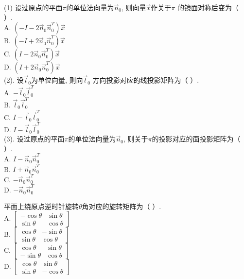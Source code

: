 \begin{ex}\label{8.8}
(1) 设过原点的平面$\pi$的单位法向量为$\vec{n}_0$, 则向量$\vec{x}$作关于$\pi$ 的镜面对称后变为（     ）.\\
A. $(-I-2\vec{n}_0\vec{n}_0^T )\vec{x}$\\
B. $(-I+2\vec{n}_0\vec{n}_0^T )\vec{x}$\\
C. $(I-2\vec{n}_0\vec{n}_0^T )\vec{x}$\\
D. $(I+2\vec{n}_0\vec{n}_0^T )\vec{x}$\\
(2). 设$\vec{l}_0$为单位向量, 则向$\vec{l}_0$ 方向投影对应的线投影矩阵为（     ）.\\
A. $-\vec{l}_0 \vec{l}_0^T$\\
B. $\vec{l}_0 \vec{l}_0^T$\\
C. $I-\vec{l}_0 \vec{l}_0^T$\\
D. $I-\vec{l}_0 \vec{l}_0^T$\\
(3). 设过原点的平面$\pi$的单位法向量为$\vec{n}_0$, 则关于$\pi$的投影对应的面投影矩阵为（      ）.\\
A. $I-\vec{n}_0 \vec{n}_0^T$\\
B. $I+\vec{n}_0 \vec{n}_0^T$\\
C. $-\vec{n}_0 \vec{n}_0^T$\\
D. $-\vec{n}_0 \vec{n}_0^T$
\end{ex}

\begin{ex}\label{8.9}
平面上绕原点逆时针旋转$\theta$角对应的旋转矩阵为（      ）.\\
A.  $\begin{bmatrix}-\cos\theta&\sin\theta \\ \sin\theta&\cos\theta\end{bmatrix}$\\
B.  $\begin{bmatrix}\cos\theta&-\sin\theta \\ \sin\theta&\cos\theta\end{bmatrix}$\\
C. $\begin{bmatrix}\cos\theta&\sin\theta \\ -\sin\theta&\cos\theta\end{bmatrix}$\\
D. $\begin{bmatrix}\cos\theta&\sin\theta \\ \sin\theta&-\cos\theta\end{bmatrix}$
\end{ex}

